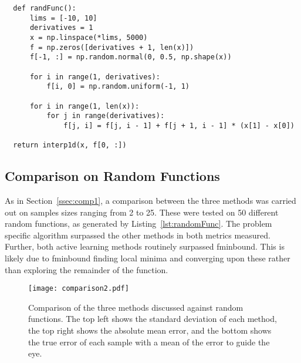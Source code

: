 \lstset{language=Python}
\lstset{frame=lines}
\lstset{basicstyle=\footnotesize}
\begin{lstlisting}
  def randFunc():
      lims = [-10, 10]
      derivatives = 1
      x = np.linspace(*lims, 5000)
      f = np.zeros([derivatives + 1, len(x)])
      f[-1, :] = np.random.normal(0, 0.5, np.shape(x))

      for i in range(1, derivatives):
          f[i, 0] = np.random.uniform(-1, 1)

      for i in range(1, len(x)):
          for j in range(derivatives):
              f[j, i] = f[j, i - 1] + f[j + 1, i - 1] * (x[1] - x[0])

  return interp1d(x, f[0, :])

\end{lstlisting}

\subsection{Comparison on Random Functions}
As in Section~\ref{ssec:comp1}, a comparison between the three methods was carried out on samples sizes ranging from 2 to 25. These were tested on 50 different random functions, as generated by Listing~\ref{lst:randomFunc}. The problem specific algorithm surpassed the other methods in both metrics measured. Further, both active learning methods routinely surpassed fminbound. This is likely due to fminbound finding local minima and converging upon these rather than exploring the remainder of the function.

\begin{figure}[htbp!] 
  \centering    
  \texttt{[image: comparison2.pdf]}
  \caption[Rigorous Comparison]{Comparison of the three methods discussed against random functions. The top left shows the standard deviation of each method, the top right shows the absolute mean error, and the bottom shows the true error of each sample with a mean of the error to guide the eye.}
  \label{fig:betterComparison}
\end{figure}